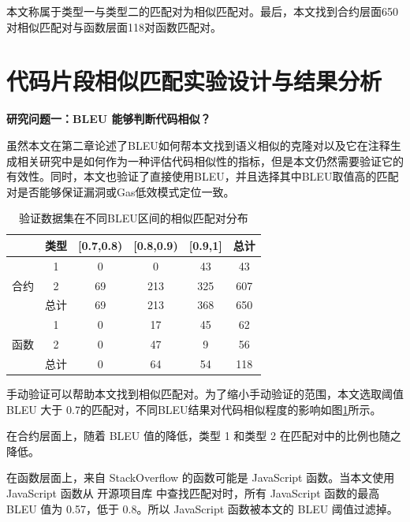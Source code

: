 本文称属于类型一与类型二的匹配对为相似匹配对。最后，本文找到合约层面650对相似匹配对与函数层面118对函数匹配对。

\section{\label{snippet_clone}代码片段相似匹配实验设计与结果分析}

\textbf{研究问题一：BLEU 能够判断代码相似？}

虽然本文在第二章论述了BLEU如何帮本文找到语义相似的克隆对以及它在注释生成相关研究中是如何作为一种评估代码相似性的指标，但是本文仍然需要验证它的有效性。同时，本文也验证了直接使用BLEU，并且选择其中BLEU取值高的匹配对是否能够保证漏洞或Gas低效模式定位一致。

\begin{table}[htbp]
\centering
\begin{tabular}{@{}cccccc@{}}
\toprule
                    & 类型 & {[}0.7,0.8) & {[}0.8,0.9) & {[}0.9,1{]} & 总计  \\ \midrule
\multirow{3}{*}{合约} & 1  & 0           & 0           & 43          & 43  \\
                    & 2  & 69          & 213         & 325         & 607 \\ \cmidrule(l){2-6} 
                    & 总计 & 69          & 213         & 368         & 650 \\ \midrule
\multirow{3}{*}{函数} & 1  & 0           & 17          & 45          & 62  \\
                    & 2  & 0           & 47          & 9           & 56  \\ \cmidrule(l){2-6} 
                    & 总计 & 0           & 64          & 54          & 118 \\ \bottomrule
\end{tabular}
\caption{验证数据集在不同BLEU区间的相似匹配对分布}
\label{manual_result}
\end{table}

手动验证可以帮助本文找到相似匹配对。为了缩小手动验证的范围，本文选取阈值 BLEU 大于 0.7的匹配对，不同BLEU结果对代码相似程度的影响如图\ref{manual_result}所示。

在合约层面上，随着 BLEU 值的降低，类型 1 和类型 2 在匹配对中的比例也随之降低。

在函数层面上，来自 StackOverflow 的函数可能是 JavaScript 函数。当本文使用 JavaScript 函数从 开源项目库 中查找匹配对时，所有 JavaScript 函数的最高 BLEU 值为 0.57，低于 0.8。所以 JavaScript 函数被本文的 BLEU 阈值过滤掉。

